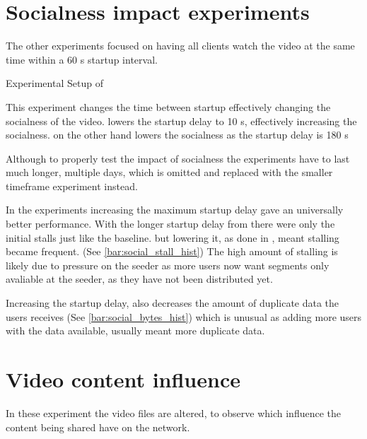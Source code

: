 \if{}

\fi

\FloatBarrier \section{Socialness impact experiments}
\label{sec:eval_socialness}
The other experiments focused on having all clients watch the video at the same time within a 60 \ac{s} startup interval.

\begin{table}[!htbp]
    \myfloatalign
    \caption[Experimental Setup of Socialness]{Experimental Setup of }
    \label{tab:exp_overview_socialness}
    
\end{table}

This experiment changes the time between startup effectively changing the socialness of the video.  lowers the startup delay to 10 \ac{s}, effectively increasing the socialness.  on the other hand lowers the socialness as the startup delay is 180 \ac{s}

Although to properly test the impact of socialness the experiments have to last much longer, multiple days, which is omitted and replaced with the smaller timeframe experiment instead.

In the experiments increasing the maximum startup delay gave an universally better performance. With the longer startup delay from  there were only the initial stalls just like the baseline. but lowering it, as done in , meant stalling became frequent. (See \autoref{bar:social_stall_hist}) The high amount of stalling is likely due to pressure on the seeder as more users now want segments only avaliable at the seeder, as they have not been distributed yet.

Increasing the startup delay, also decreases the amount of duplicate data the users receives (See \autoref{bar:social_bytes_hist}) which is unusual as adding more users with the data available, usually meant more duplicate data. %

\if{}


\fi

\FloatBarrier 
\section{Video content influence}
\label{sec:eval_video}
In these experiment the video files are altered, to observe which influence the content being shared have on the network.

